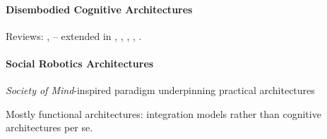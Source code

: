 \documentclass[11pt,a4paper]{report}
\begin{document}
\paragraph{Disembodied Cognitive Architectures}

Reviews: \cite{chong2007integrated}, \cite{vernon2007survey} --
extended in \cite{kingdon2008review}, \cite{duch2008cognitive},
\cite{langley2009cognitive}, \cite{taatgen2010past},
\cite{thorisson2012cognitive}.


\paragraph{Social Robotics Architectures}\label{sec:robots}


\emph{Society of Mind}-inspired paradigm underpinning practical architectures

Mostly functional architectures: integration models rather than cognitive
architectures per se.
\end{document}
